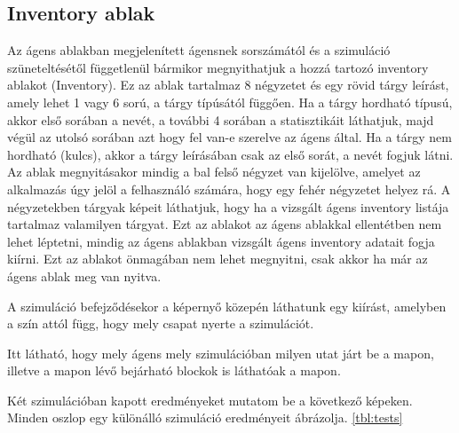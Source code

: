 \subsection{Inventory ablak}
Az ágens ablakban megjelenített ágensnek sorszámától és a szimuláció szüneteltésétől függetlenül bármikor megnyithatjuk a hozzá tartozó inventory ablakot (Inventory).
Ez az ablak tartalmaz 8 négyzetet és egy rövid tárgy leírást, amely lehet 1 vagy 6 sorú, a tárgy típúsától függően. Ha a tárgy hordható típusú, akkor első sorában a nevét, 
a további 4 sorában a statisztikáit láthatjuk, majd végül az utolsó sorában azt hogy fel van-e szerelve az ágens által. Ha a tárgy nem hordható (kulcs), 
akkor a tárgy leírásában csak az első sorát, a nevét fogjuk látni.
Az ablak megnyitásakor mindig a bal felső négyzet van kijelölve, amelyet az alkalmazás úgy jelöl a felhasználó számára, hogy egy fehér négyzetet helyez rá.
A négyzetekben tárgyak képeit láthatjuk, hogy ha a vizsgált ágens inventory listája tartalmaz valamilyen tárgyat.
Ezt az ablakot az ágens ablakkal ellentétben nem lehet léptetni, mindig az ágens ablakban vizsgált ágens inventory adatait fogja kiírni.
Ezt az ablakot önmagában nem lehet megnyitni, csak akkor ha már az ágens ablak meg van nyitva.


A szimuláció befejződésekor a képernyő közepén láthatunk egy kiírást, amelyben a szín attól függ, hogy mely csapat nyerte a szimulációt.


Itt látható, hogy mely ágens mely szimulációban milyen utat járt be a mapon, illetve a mapon lévő bejárható blockok is láthatóak a mapon.

Két szimulációban kapott eredményeket mutatom be a következő képeken. Minden oszlop egy különálló szimuláció eredményeit ábrázolja. \ref{tbl:tests}

